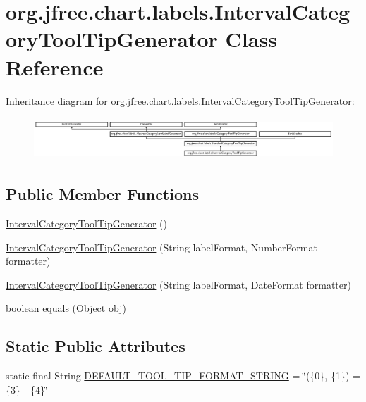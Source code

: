 \hypertarget{classorg_1_1jfree_1_1chart_1_1labels_1_1_interval_category_tool_tip_generator}{}\section{org.\+jfree.\+chart.\+labels.\+Interval\+Category\+Tool\+Tip\+Generator Class Reference}
\label{classorg_1_1jfree_1_1chart_1_1labels_1_1_interval_category_tool_tip_generator}
Inheritance diagram for org.\+jfree.\+chart.\+labels.\+Interval\+Category\+Tool\+Tip\+Generator\+:\begin{figure}[H]
\begin{center}
\leavevmode
\includegraphics[height=1.590909cm]{classorg_1_1jfree_1_1chart_1_1labels_1_1_interval_category_tool_tip_generator}
\end{center}
\end{figure}
\subsection*{Public Member Functions}
\begin{DoxyCompactItemize}
\item 
\mbox{\hyperlink{classorg_1_1jfree_1_1chart_1_1labels_1_1_interval_category_tool_tip_generator_ad30e46e6c74820e6396ea2490b6bf63f}{Interval\+Category\+Tool\+Tip\+Generator}} ()
\item 
\mbox{\hyperlink{classorg_1_1jfree_1_1chart_1_1labels_1_1_interval_category_tool_tip_generator_a8221890f4a7f5b9526879a8e765924a2}{Interval\+Category\+Tool\+Tip\+Generator}} (String label\+Format, Number\+Format formatter)
\item 
\mbox{\hyperlink{classorg_1_1jfree_1_1chart_1_1labels_1_1_interval_category_tool_tip_generator_a23f75d4612f33f73d25cebc9808d2e9d}{Interval\+Category\+Tool\+Tip\+Generator}} (String label\+Format, Date\+Format formatter)
\item 
boolean \mbox{\hyperlink{classorg_1_1jfree_1_1chart_1_1labels_1_1_interval_category_tool_tip_generator_a556f15464a63815ec9b6d98e13b43734}{equals}} (Object obj)
\end{DoxyCompactItemize}
\subsection*{Static Public Attributes}
\begin{DoxyCompactItemize}
\item 
static final String \mbox{\hyperlink{classorg_1_1jfree_1_1chart_1_1labels_1_1_interval_category_tool_tip_generator_adf3388e99c9d1bf7526762eee511cd76}{D\+E\+F\+A\+U\+L\+T\+\_\+\+T\+O\+O\+L\+\_\+\+T\+I\+P\+\_\+\+F\+O\+R\+M\+A\+T\+\_\+\+S\+T\+R\+I\+NG}} = \char`\"{}(\{0\}, \{1\}) = \{3\} -\/ \{4\}\char`\"{}
\end{DoxyCompactItemize}
